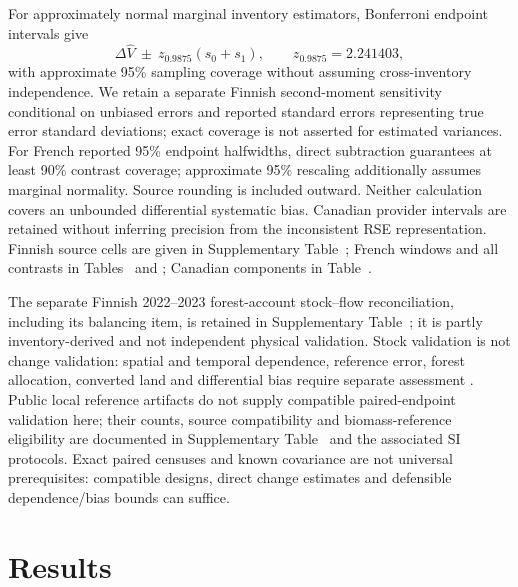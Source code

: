 \documentclass[11pt,a4paper]{article}
\begin{document}
For approximately normal marginal inventory estimators, Bonferroni endpoint intervals give
\begin{equation}
\Delta\widehat V\ \pm\ z_{0.9875}(s_0+s_1),\qquad z_{0.9875}=2.241403,\label{eq:invbonf}
\end{equation}
with approximate 95\% sampling coverage without assuming cross-inventory independence. We retain a separate Finnish second-moment sensitivity conditional on unbiased errors and reported standard errors representing true error standard deviations; exact coverage is not asserted for estimated variances. For French reported 95\% endpoint halfwidths, direct subtraction guarantees at least 90\% contrast coverage; approximate 95\% rescaling additionally assumes marginal normality. Source rounding is included outward. Neither calculation covers an unbounded differential systematic bias. Canadian provider intervals are retained without inferring precision from the inconsistent RSE representation. Finnish source cells are given in Supplementary Table~; French windows and all contrasts in Tables~ and ; Canadian components in Table~.

The separate Finnish 2022--2023 forest-account stock--flow reconciliation, including its balancing item, is retained in Supplementary Table~; it is partly inventory-derived and not independent physical validation. Stock validation is not change validation: spatial and temporal dependence, reference error, forest allocation, converted land and differential bias require separate assessment \citep{Olofsson2014,E3UB2025,PVIR2026}. Public local reference artifacts do not supply compatible paired-endpoint validation here; their counts, source compatibility and biomass-reference eligibility are documented in Supplementary Table~ and the associated SI protocols. Exact paired censuses and known covariance are not universal prerequisites: compatible designs, direct change estimates and defensible dependence/bias bounds can suffice.

\section{Results}
\end{document}
